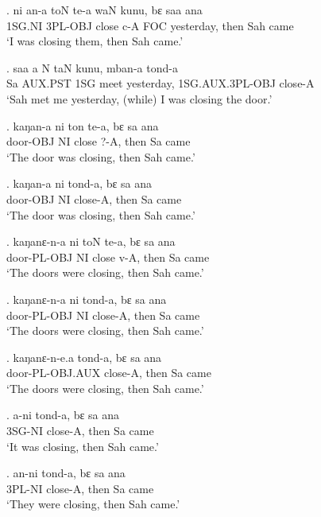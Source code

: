 \documentclass{assets/fieldnotes}
\begin{document}
\exg.
ni       an-a      toN     te-a   waN   kunu,        bɛ     saa   ana  \\
1SG.NI   3PL-OBJ   close   c-A    FOC   yesterday,   then   Sah   came \\%
`I was closing them, then Sah came.'

\exg.
saa   a     N     taN    kunu,        mban-a            tond-a  \\
Sa    AUX.PST   1SG   meet   yesterday,   1SG.AUX.3PL-OBJ   close-A \\%
`Sah met me yesterday, (while) I was closing the door.'

\exg.
kaŋan-a    ni   ton     te-a,   bɛ     sa   ana  \\
door-OBJ   NI   close   ?-A,    then   Sa   came \\%
`The door was closing, then Sah came.'

\exg.
kaŋan-a    ni   tond-a,    bɛ     sa   ana  \\
door-OBJ   NI   close-A,   then   Sa   came \\%
`The door was closing, then Sah came.'

\exg.
kaŋanɛ-n-a    ni   toN     te-a,   bɛ     sa   ana  \\
door-PL-OBJ   NI   close   v-A,    then   Sa   came \\%
`The doors were closing, then Sah came.'

\exg.
kaŋanɛ-n-a    ni   tond-a,    bɛ     sa   ana  \\
door-PL-OBJ   NI   close-A,   then   Sa   came \\%
`The doors were closing, then Sah came.'

\exg.
kaŋanɛ-n-e.a      tond-a,    bɛ     sa   ana  \\
door-PL-OBJ.AUX   close-A,   then   Sa   came \\%
`The doors were closing, then Sah came.'

\exg.
a-ni     tond-a,    bɛ     sa   ana  \\ 
3SG-NI   close-A,   then   Sa   came \\%
`It was closing, then Sah came.' \label{10893}

\exg.
an-ni     tond-a,    bɛ     sa   ana  \\ 
3PL-NI   close-A,   then   Sa   came \\%
`They were closing, then Sah came.' \label{59676}

\end{document}
